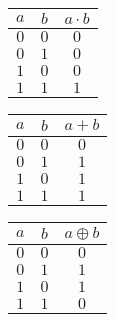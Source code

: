 \begin{Row}
	\begin{Cell}{1}
		\centering
		\begin{tabular}{cc|c}
			\toprule
			$a$ & $b$ & $a\cdot b$ \\
			\midrule
			$0$ & $0$ & $0$        \\
			$0$ & $1$ & $0$        \\
			$1$ & $0$ & $0$        \\
			$1$ & $1$ & $1$        \\
			\bottomrule
		\end{tabular}
		\vspace{1ex}
	\end{Cell}
	\begin{Cell}{1}
		\centering
		\begin{tabular}{cc|c}
			\toprule
			$a$ & $b$ & $a+b$ \\
			\midrule
			$0$ & $0$ & $0$   \\
			$0$ & $1$ & $1$   \\
			$1$ & $0$ & $1$   \\
			$1$ & $1$ & $1$   \\
			\bottomrule
		\end{tabular}
		\vspace{1ex}
	\end{Cell}
	\begin{Cell}{1}
		\centering
		\begin{tabular}{cc|c}
			\toprule
			$a$ & $b$ & $a \oplus b$ \\
			\midrule
			$0$ & $0$ & $0$          \\
			$0$ & $1$ & $1$          \\
			$1$ & $0$ & $1$          \\
			$1$ & $1$ & $0$          \\
			\bottomrule
		\end{tabular}
		\vspace{1ex}
	\end{Cell}
\end{Row}
